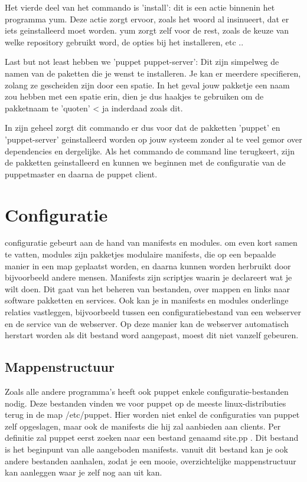 Het vierde deel van het commando is 'install': dit is een actie binnenin het programma yum. Deze actie zorgt ervoor, zoals het woord al insinueert, dat er iets geinstalleerd moet worden. yum zorgt zelf voor de rest, zoals de keuze van welke repository gebruikt word, de opties bij het installeren, etc ..

Last but not least hebben we 'puppet puppet-server': Dit zijn simpelweg de namen van de paketten die je wenst te installeren. Je kan er meerdere specifieren, zolang ze gescheiden zijn door een spatie. In het geval jouw pakketje een naam zou hebben met een spatie erin, dien je dus haakjes te gebruiken om de pakketnaam te 'quoten' < ja inderdaad zoals dit.

In zijn geheel zorgt dit commando er dus voor dat de pakketten 'puppet' en 'puppet-server' geinstalleerd worden op jouw systeem zonder al te veel gemor over dependencies en dergelijke. Als het commando de command line terugkeert, zijn de pakketten geinstalleerd en kunnen we beginnen met de configuratie van de puppetmaster en daarna de puppet client.


\section{Configuratie}
configuratie gebeurt aan de hand van manifests en modules. om even kort samen te vatten, modules zijn pakketjes modulaire manifests, die op een bepaalde manier in een map geplaatst worden, en daarna kunnen worden herbruikt door bijvoorbeeld andere mensen. Manifests zijn scriptjes waarin je declareert wat je wilt doen. Dit gaat van het beheren van bestanden, over mappen en links naar software pakketten en services.
Ook kan je in manifests en modules onderlinge relaties vastleggen, bijvoorbeeld tussen een configuratiebestand van een webserver en de service van de webserver. Op deze manier kan de webserver automatisch herstart worden als dit bestand word aangepast, moest dit niet vanzelf gebeuren.

\subsection{Mappenstructuur}
Zoals alle andere programma's heeft ook puppet enkele configuratie-bestanden nodig. Deze bestanden vinden we voor puppet op de meeste linux-distributies terug in de map /etc/puppet. Hier worden niet enkel de configuraties van puppet zelf opgeslagen, maar ook de manifests die hij zal aanbieden aan clients. Per definitie zal puppet eerst zoeken naar een bestand genaamd site.pp . Dit bestand is het beginpunt van alle aangeboden manifests. vanuit dit bestand kan je ook andere bestanden aanhalen, zodat je een mooie, overzichtelijke mappenstructuur kan aanleggen waar je zelf nog aan uit kan.

